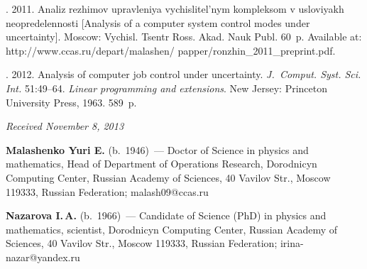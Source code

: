 \begin{multicols}{2}
{{\begin{thebibliography}{9}
. 
2011. Analiz rezhimov upravleniya vychislitel'nym kompleksom v usloviyakh neopredelen\-nosti 
[Analysis of a computer system control modes under uncertainty]. Moscow: Vychisl. 
Tsentr Ross. Akad. Nauk Publ. 60~p. 
Available at: {\sf http://www.ccas.ru/depart/malashen/ papper/ronzhin\_2011\_preprint.pdf}.  

. 2012. Analysis of computer job control under uncertainty. 
\textit{J.~Comput. Syst. Sci. Int.} 51:49--64. 
\textit{Linear programming and extensions}. 
New Jersey: Princeton University Press, 1963. 589~p.



\end{thebibliography}
} }


\end{multicols}

\vspace*{-6pt}

\hfill{\small\textit{Received November 8, 2013}}

\vspace*{-18pt}

\Contr

\noindent
\textbf{Malashenko Yuri E.} (b.\ 1946)~--- Doctor of Science in physics and 
mathematics, Head of Department of Operations Research, Dorodnicyn Computing Center, Russian Academy of
Sciences, 40 Vavilov Str.,
Moscow 119333, Russian Federation; malash09@ccas.ru 

\vspace*{2pt}

\noindent
\textbf{Nazarova I.\,A.} (b.\ 1966)~--- Candidate of Science (PhD) 
in physics and 
mathematics, scientist, Dorodnicyn Computing Center, Russian Academy of
Sciences, 40 Vavilov Str.,
Moscow 119333, Russian Federation; irina-nazar@yandex.ru



 \label{end\stat}
 
\renewcommand{\bibname}{\protect\rm Литература}





  
  